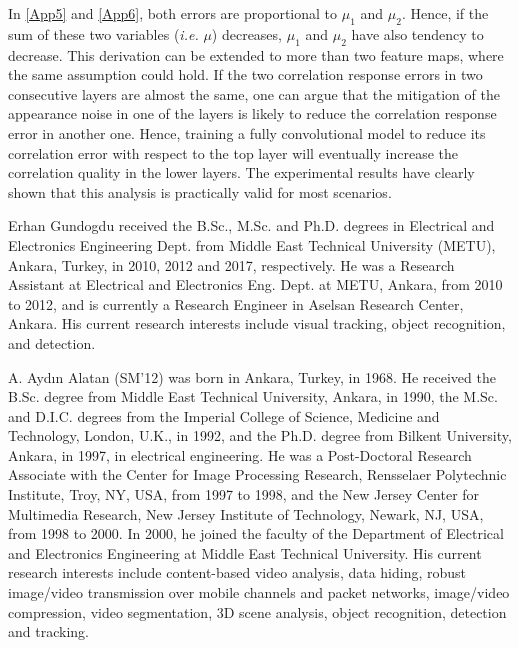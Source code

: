 \documentclass[journal]{IEEEtran}
\begin{document}
\normalsize
In \eqref{App5} and \eqref{App6}, both errors are proportional to $\mu_1$ and $\mu_2$. Hence, if the sum of these two variables (\emph{i.e.} $\mu$) decreases, $\mu_1$ and $\mu_2$ have also tendency to decrease. This derivation can be extended to more than two feature maps, where the same assumption could hold. If the two correlation response errors in two consecutive layers are almost the same, one can argue that the mitigation of the appearance noise in one of the layers is likely to reduce the correlation response error in another one. Hence, training a fully convolutional model to reduce its correlation error with respect to the top layer will eventually increase the correlation quality in the lower layers. The experimental results have clearly shown that this analysis is practically valid for most scenarios.


\ifCLASSOPTIONcaptionsoff
  \newpage
\fi




\clearpage
\begin{IEEEbiography}{Erhan Gundogdu}
received the B.Sc., M.Sc. and Ph.D. degrees in Electrical and Electronics Engineering Dept. from Middle East Technical University (METU), Ankara, Turkey, in 2010, 2012 and 2017, respectively. He was a Research Assistant at Electrical and Electronics Eng. Dept. at METU, Ankara, from 2010 to 2012, and is currently a Research Engineer in Aselsan Research Center, Ankara. His current research interests include visual tracking, object recognition, and detection.
\end{IEEEbiography}
\begin{IEEEbiography}{A. Ayd\i n Alatan}
(SM’12) was born in Ankara, Turkey, in 1968. He received the B.Sc. degree from Middle East Technical University, Ankara, in 1990, the M.Sc. and D.I.C. degrees from the Imperial College of Science, Medicine and Technology, London, U.K., in 1992, and the Ph.D. degree from Bilkent University, Ankara, in 1997, in electrical engineering. He was a Post-Doctoral Research Associate with the Center for Image Processing Research, Rensselaer Polytechnic Institute, Troy, NY, USA, from 1997 to 1998, and the New Jersey Center for Multimedia Research, New Jersey Institute of Technology, Newark, NJ, USA, from 1998 to 2000. In 2000, he joined the faculty of the Department of Electrical and Electronics Engineering at Middle East Technical University. His current research interests include content-based video analysis, data hiding, robust image/video transmission over mobile channels and packet networks, image/video compression, video segmentation, 3D scene analysis, object recognition, detection and tracking.
\end{IEEEbiography}
\end{document}
